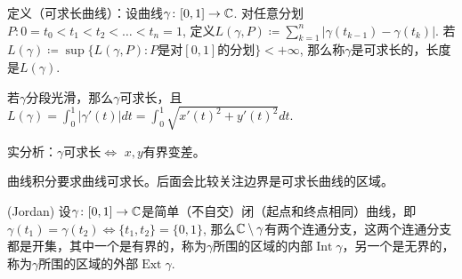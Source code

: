 定义（可求长曲线）：设曲线$\gamma\colon [0,1]\to\mathbb{C}$. 对任意分划$P\colon 0=t_0<t_1<t_2<\dots<t_n=1$, 定义$L(\gamma,P)\coloneq\sum_{k=1}^{n}|\gamma(t_{k-1})-\gamma(t_k)|$. 若$L(\gamma)\coloneq\sup \{L(\gamma,P)\colon P\text{是对}[0,1]\text{的分划}\}<+\infty$, 那么称$\gamma$是可求长的，长度是$L(\gamma)$.

若$\gamma$分段光滑，那么$\gamma$可求长，且$L(\gamma)=\int_{0}^{1}|\gamma'(t)|dt=\int_{0}^{1}\sqrt{x'(t)^2+y'(t)^2}dt$.

实分析：$\gamma$可求长$\Leftrightarrow$ $x,y$有界变差。

曲线积分要求曲线可求长。后面会比较关注边界是可求长曲线的区域。

\begin{theorem}
    (Jordan) 设$\gamma\colon [0,1]\to\mathbb{C}$是简单（不自交）闭（起点和终点相同）曲线，即$\gamma(t_1)=\gamma(t_2)\Leftrightarrow \{t_1,t_2\}=\{0,1\}$, 那么$\mathbb{C}\setminus\gamma$有两个连通分支，这两个连通分支都是开集，其中一个是有界的，称为$\gamma$所围的区域的内部$\operatorname{Int}\gamma$，另一个是无界的，称为$\gamma$所围的区域的外部$\operatorname{Ext}\gamma$.
\end{theorem}